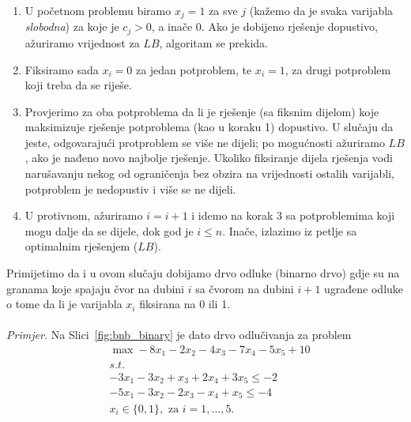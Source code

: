 \documentclass[a4paper, utf8, 11pt, colorlinks]{book}
\begin{document}
\begin{enumerate}
    \item U početnom problemu  biramo $x_j=1$ za sve $j$ (kažemo da je svaka varijabla \emph{slobodna}) za koje je $c_j > 0$, a inače 0. Ako je dobijeno rješenje dopustivo, ažuriramo vrijednost za $LB$, algoritam se prekida.
    \item Fiksiramo sada $x_i=0$ za jedan potproblem, te $x_i=1$, za drugi potproblem koji treba da se riješe.
    
    \item  Provjerimo za oba potproblema da li je rješenje (sa fiksnim dijelom) koje maksimizuje rješenje potproblema (kao u koraku 1) dopustivo. U slučaju da jeste,   odgovarajući protproblem se više ne dijeli; po mogućnosti ažuriramo $LB$, ako je nađeno novo najbolje rješenje.  Ukoliko fiksiranje dijela rješenja vodi narušavanju nekog od ograničenja bez obzira na vrijednosti ostalih varijabli, potproblem je nedopustiv i više se ne dijeli. 
    
    
    \item U protivnom, ažuriramo $i = i+1$ i idemo na korak 3 sa potproblemima koji mogu dalje da se dijele, dok god je $i \leq n$. Inače, izlazimo iz petlje sa optimalnim rješenjem ($LB$). 
\end{enumerate}
 Primijetimo da i u ovom slučaju dobijamo drvo odluke (binarno drvo) gdje su na granama koje spajaju čvor na dubini $i$ sa čvorom na dubini $i+1$  ugrađene odluke o tome da li je varijabla $x_i$ fiksirana na 0 ili 1.\\
\vspace{0.4cm} \\
\emph{Primjer.} Na Slici~\ref{fig:bnb_binary} je dato drvo odlučivanja za problem 
\begin{align*}
   &\max -8 x_1 - 2x_2 - 4x_3 - 7x_4 -5x_5 + 10 \\
   & s.t. \\
   & -3 x_1 - 3 x_2 + x_3 + 2 x_4 + 3 x_5 \leq -2 \\
   & -5 x_1 - 3 x_2 - 2 x_3 - x_4 + x_5 \leq -4 \\
   & x_i \in \{0, 1\}, \mbox{ za } i=1,\ldots,5.
\end{align*}

\end{document}
